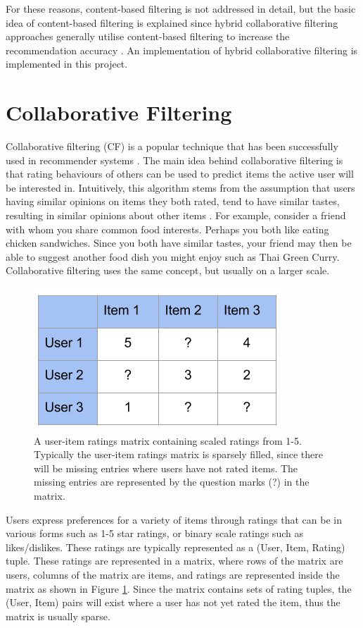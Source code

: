 For these reasons, content-based filtering is not addressed in detail, but the basic idea of content-based filtering is explained since hybrid collaborative filtering approaches generally utilise content-based filtering to increase the recommendation accuracy \cite{survey}. An implementation of hybrid collaborative filtering is implemented in this project.  

\section{Collaborative Filtering}

Collaborative filtering (CF) is a popular technique that has been successfully used in recommender systems \cite{itembased, schafer2007collaborative, survey}. The main idea behind collaborative filtering is that rating behaviours of others can be used to predict items the active user will be interested in. Intuitively, this algorithm stems from the assumption that users having similar opinions on items they both rated, tend to have similar tastes, resulting in similar opinions about other items \cite{schafer2007collaborative}. For example, consider a friend with whom you share common food interests. Perhaps you both like eating chicken sandwiches. Since you both have similar tastes, your friend may then be able to suggest another food dish you might enjoy such as Thai Green Curry. Collaborative filtering uses the same concept, but usually on a larger scale. 

\begin{figure}
\centering
\includegraphics[scale=0.7]{images/User-Item}
\caption{A user-item ratings matrix containing scaled ratings from 1-5. Typically the user-item ratings matrix is sparsely filled, since there will be missing entries where users have not rated items. The missing entries are represented by the question marks (?) in the matrix. }
\label{fig:matrix}
\end{figure}

Users express preferences for a variety of items through ratings that can be in various forms such as 1-5 star ratings, or binary scale ratings such as likes/dislikes. These ratings are typically represented as a (User, Item, Rating) tuple. These ratings are represented in a matrix, where rows of the matrix are users, columns of the matrix are items, and ratings are represented inside the matrix as shown in Figure \ref{fig:matrix}. Since the matrix contains sets of rating tuples, the (User, Item) pairs will exist where a user has not yet rated the item, thus the matrix is usually sparse.

